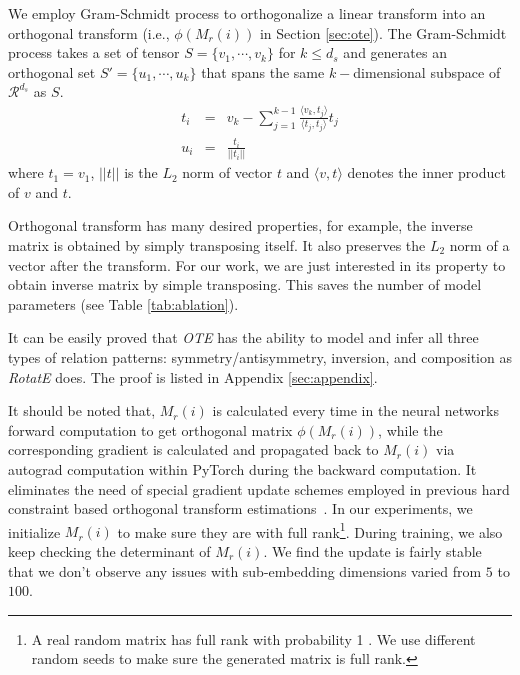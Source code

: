 \documentclass[11pt,a4paper]{article}
\begin{document}
We employ Gram-Schmidt process to orthogonalize a linear transform into an orthogonal transform (i.e., $\phi(M_r(i))$ in Section \ref{sec:ote}). The Gram-Schmidt process takes a set of tensor $S=\{v_1,\cdots,v_k\}$ for $k\leq {d_s}$ and generates an orthogonal set
$S'=\{u_1,\cdots,u_k\}$ that spans the same $k-$dimensional subspace of $\mathcal{R}^{d_s}$ as $S$. 
\begin{eqnarray}
    t_i &=& v_k - \sum_{j=1}^{k-1}\frac{\langle v_k,t_j\rangle}{\langle t_j,t_j\rangle}t_j \\
    u_i &=& \frac{t_i}{||t_i||} \label{gc_unit}
\end{eqnarray}
where $t_1=v_1$, $||t||$ is the $L_2$ norm of vector $t$ and $\langle v,t\rangle$ denotes the inner product of $v$ and $t$. 

Orthogonal transform has many desired properties,
for example, the inverse matrix is obtained by simply transposing itself. It also preserves the $L_2$ norm of a vector after the transform. 
For our work, we are just interested in its property to obtain inverse matrix by simple transposing. This saves the number of model parameters (see Table \ref{tab:ablation}).


It can be easily proved that {\em OTE} has the ability to model and infer all three types of relation patterns: symmetry/antisymmetry, inversion, and composition as {\em RotatE} does. The proof is listed in Appendix \ref{sec:appendix}.

It should be noted that, $M_r(i)$ is calculated every time in the neural networks forward computation to get orthogonal matrix $\phi(M_r(i))$, while the corresponding gradient is calculated and propagated back to $M_r(i)$ via autograd computation within PyTorch during the backward computation. 
It eliminates the need of special gradient update schemes employed in previous hard constraint based orthogonal transform estimations~\cite{Harandi2016GeneralizedB,Vorontsov2017OnOA}.
In our experiments, we initialize $M_r(i)$ to make sure they are with full rank\footnote{A real random matrix has full rank with probability 1 \cite{slinko2000generalization}. We use different random seeds to make sure the generated matrix is full rank.}. During training, we also keep checking the determinant of $M_r(i)$. We find the update is fairly stable that we don't observe any issues with sub-embedding dimensions varied from $5$ to $100$.
\end{document}
